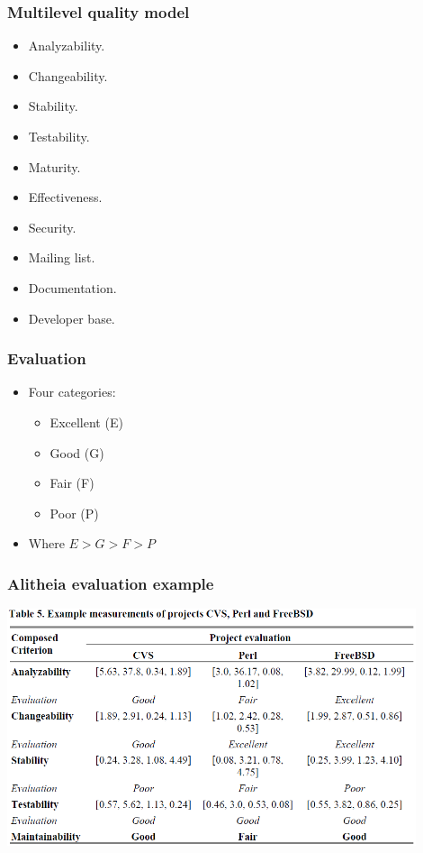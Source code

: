 \documentclass{beamer}
\begin{document}
\begin{frame}
\frametitle{Multilevel quality model}
\begin{center}
\begin{itemize}
\item Analyzability.
\item Changeability.
\item Stability.
\item Testability.
\item Maturity.
\item Effectiveness.
\item Security.
\item Mailing list.
\item Documentation.
\item Developer base.


\end{itemize}
\end{center}
\end{frame}

\begin{frame}
\frametitle{Evaluation}
\begin{center}
\begin{itemize}
\item Four categories:
\begin{itemize}
 \item Excellent (E)
 \item Good (G)
 \item Fair (F)
 \item Poor (P)
\end{itemize}
\item Where $E > G > F > P$
\end{itemize}
\end{center}
\end{frame}

\begin{frame}
\frametitle{Alitheia evaluation example}
\begin{center}
\includegraphics[width=0.9\textwidth]{figs/alitheia-eval-example.png}
\end{center}
\end{frame}
\end{document}
